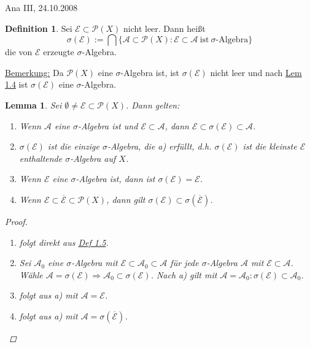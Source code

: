 \documentclass[a4paper]{report}
\newcommand{\PowerSet}{\mathcal{P}}
\newcommand{\jlabel}[1]{\label{j_#1}}
\newcommand{\jhyperref}[2]{\hyperref[j_#1]{#2}}
\newcommand{\jlink}[1]{\jhyperref{#1}{#1}}
\newcommand{\jspacesmall}{\vspace{4pt}}
\newcommand{\jdate}[1]{\jspacesmall\begin{center}\jlabel{#1}\tiny{Ana III, #1}\end{center}}
\theoremstyle{plain}
\newtheorem{lem}[thm]{Lemma}
\theoremstyle{definition}
\newtheorem{defn}[thm]{Definition}
\begin{document}
\jdate{24.10.2008}

\begin{defn}
\jlabel{Def 1.5}
    Sei $\mathcal{E} \subset \PowerSet(X)$ nicht leer. Dann heißt
    \begin{displaymath}
        \sigma(\mathcal{E}) := \bigcap\{\mathcal{A} \subset \PowerSet(X) : \mathcal{E} \subset \mathcal{A} \ \text{ist} \ \sigma\text{-Algebra}\}
    \end{displaymath}
    die von $\mathcal{E}$ erzeugte $\sigma$-Algebra.
    
    \vspace{12pt}
    
    \uline{Bemerkung:} Da $\PowerSet(X)$ eine $\sigma$-Algebra ist, ist $\sigma(\mathcal{E})$ nicht leer und nach \jlink{Lem 1.4} ist $\sigma(\mathcal{E})$ eine $\sigma$-Algebra.
\end{defn}

\begin{lem}
\jlabel{Lem 1.6}
    Sei $\emptyset \ne \mathcal{E} \subset \PowerSet(X)$. Dann gelten:
    \begin{enumerate}
        \item Wenn $\mathcal{A}$ eine $\sigma$-Algebra ist und $\mathcal{E} \subset \mathcal{A}$, dann $\mathcal{E} \subset \sigma(\mathcal{E}) \subset \mathcal{A}$.
        \item $\sigma(\mathcal{E})$ ist die einzige $\sigma$-Algebra, die a) erfüllt, d.h. $\sigma(\mathcal{E})$ ist die kleinste $\mathcal{E}$ enthaltende $\sigma$-Algebra auf $X$.
        \item Wenn $\mathcal{E}$ eine $\sigma$-Algebra ist, dann ist $\sigma(\mathcal{E}) = \mathcal{E}$.
        \item Wenn $\mathcal{E} \subset \overline{\mathcal{E}} \subset \PowerSet(X)$, dann gilt $\sigma(\mathcal{E}) \subset \sigma(\mathcal{\overline{E}})$.
    \end{enumerate}
    \begin{proof}
        \begin{enumerate}
            \item folgt direkt aus \jlink{Def 1.5}.
            \item
                Sei $\mathcal{A}_0$ eine $\sigma$-Algebra mit $\mathcal{E} \subset \mathcal{A}_0 \subset \mathcal{A}$ für jede $\sigma$-Algebra $\mathcal{A}$ mit $\mathcal{E} \subset \mathcal{A}$. Wähle $\mathcal{A} = \sigma(\mathcal{E}) \Rightarrow \mathcal{A}_0 \subset \sigma(\mathcal{E})$. Nach a) gilt mit $\mathcal{A} = \mathcal{A}_0: \sigma(\mathcal{E}) \subset \mathcal{A}_0$.
            \item folgt aus a) mit $\mathcal{A} = \mathcal{E}$.
            \item folgt aus a) mit $\mathcal{A} = \sigma(\overline{\mathcal{E}})$.
        \end{enumerate}
    \end{proof}
\end{lem}
\end{document}
